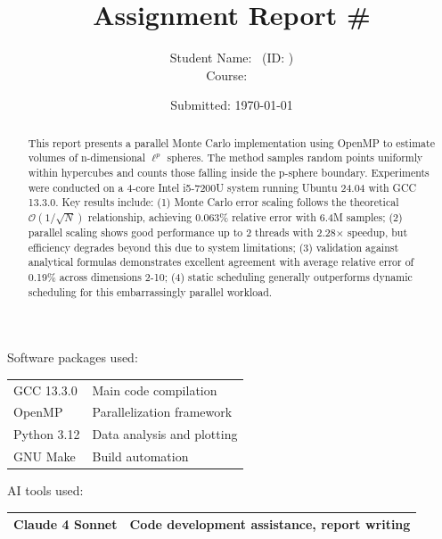 \documentclass[11pt,a4paper]{article}
\title{Assignment Report \#\assignmentnumber \\ \assignmenttitle}
\author{Student Name: \studentname \ (ID: \studentid) \\ Course: \coursecode \ \coursename
}
\date{Submitted: \today}
\begin{document}
	\maketitle
	
	\begin{center}
		{Software packages used:} \\
		\begin{tabular}{|l|l|}
			\hline
			GCC 13.3.0               &  Main code compilation \\
			OpenMP                   &  Parallelization framework \\
			Python 3.12              &  Data analysis and plotting \\
			GNU Make                 &  Build automation \\
			\hline
		\end{tabular}
	\end{center}
	
	\begin{center}
		{AI tools used:} \\
		\begin{tabular}{|l|l|}
			\hline
			Claude 4 Sonnet         & Code development assistance, report writing \\
			\hline
		\end{tabular}
	\end{center}
	\vspace{2em}
	
	\begin{abstract}
		\noindent
		This report presents a parallel Monte Carlo implementation using OpenMP to estimate volumes of n-dimensional $\ell^p$ spheres. The method samples random points uniformly within hypercubes and counts those falling inside the p-sphere boundary. Experiments were conducted on a 4-core Intel i5-7200U system running Ubuntu 24.04 with GCC 13.3.0. Key results include: (1) Monte Carlo error scaling follows the theoretical $\mathcal{O}(1/\sqrt{N})$ relationship, achieving 0.063\% relative error with 6.4M samples; (2) parallel scaling shows good performance up to 2 threads with 2.28× speedup, but efficiency degrades beyond this due to system limitations; (3) validation against analytical formulas demonstrates excellent agreement with average relative error of 0.19\% across dimensions 2-10; (4) static scheduling generally outperforms dynamic scheduling for this embarrassingly parallel workload.
	\end{abstract}
	
\end{document}
